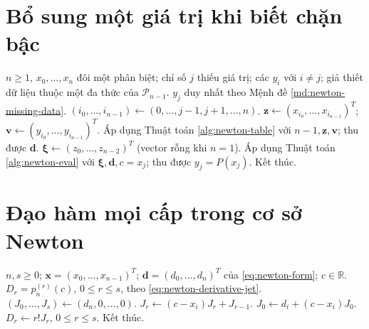 \documentclass[12pt,a4paper,oneside]{book}
\numberwithin{algorithm}{chapter}
\theoremstyle{definition}
\newcommand{\R}{\mathbb{R}}
\begin{document}
\section{Bổ sung một giá trị khi biết chặn bậc}
\begin{algorithm}[H]
\caption{Giá trị còn thiếu với giả thiết bậc không quá $n-1$}
\label{alg:newton-missing-value}
\begin{algorithmic}[1]
\Require $n\geq1$, $x_0,\ldots,x_n$ đôi một phân biệt; chỉ số $j$ thiếu giá trị; các $y_i$ với $i\ne j$; giả thiết dữ liệu thuộc một đa thức của $\mathcal P_{n-1}$.
\Ensure $y_j$ duy nhất theo Mệnh đề \ref{md:newton-missing-data}.
\State $(i_0,\ldots,i_{n-1})\gets(0,\ldots,j-1,j+1,\ldots,n)$.
\State $\boldsymbol z\gets(x_{i_0},\ldots,x_{i_{n-1}})^T$; $\boldsymbol v\gets(y_{i_0},\ldots,y_{i_{n-1}})^T$.
\State Áp dụng Thuật toán \ref{alg:newton-table} với $n-1,\boldsymbol z,\boldsymbol v$; thu được $\boldsymbol d$.
\State $\boldsymbol\xi\gets(z_0,\ldots,z_{n-2})^T$ (vector rỗng khi $n=1$).
\State Áp dụng Thuật toán \ref{alg:newton-eval} với $\boldsymbol\xi,\boldsymbol d,c=x_j$; thu được $y_j=P(x_j)$.
\State Kết thúc.
\end{algorithmic}
\end{algorithm}

\section{Đạo hàm mọi cấp trong cơ sở Newton}
\begin{algorithm}[H]
\caption{Horner với vector đạo hàm đã chuẩn hóa}
\label{alg:newton-derivative-jet}
\begin{algorithmic}[1]
\Require $n,s\geq0$; $\boldsymbol x=(x_0,\ldots,x_{n-1})^T$; $\boldsymbol d=(d_0,\ldots,d_n)^T$ của \eqref{eq:newton-form}; $c\in\R$.
\Ensure $D_r=p_n^{(r)}(c)$, $0\leq r\leq s$, theo \eqref{eq:newton-derivative-jet}.
\State $(J_0,\ldots,J_s)\gets(d_n,0,\ldots,0)$.
    \State $J_r\gets(c-x_i)J_r+J_{r-1}$.
  \EndFor
  \Statex
  \State $J_0\gets d_i+(c-x_i)J_0$.
\EndFor
\Statex
\State $D_r\gets r!J_r$, $0\leq r\leq s$.
\State Kết thúc.
\end{algorithmic}
\end{algorithm}

\end{document}
